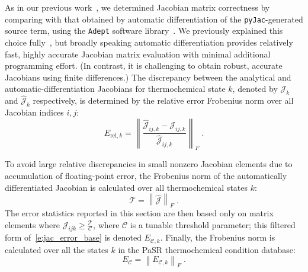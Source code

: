 \documentclass[12pt,number,sort&compress,preprint]{elsarticle}
\begin{document}
As in our previous work~\cite{Niemeyer:2016aa}, we determined Jacobian matrix correctness by comparing with that obtained by automatic differentiation of the \texttt{pyJac}-generated source term, using the \texttt{Adept} software library~\cite{adept-v11,hogan2014fast}.
We previously explained this choice fully~\cite{Niemeyer:2016aa}, but broadly speaking automatic differentiation provides relatively fast, highly accurate Jacobian matrix evaluation with minimal additional programming effort.
(In contrast, it is challenging to obtain robust, accurate Jacobians using finite differences.)
The discrepancy between the analytical and automatic-differentiation Jacobians for thermochemical state $k$, denoted by $\mathcal{J}_k$ and $\hat{\mathcal{J}}_k$ respectively, is determined by the relative error Frobenius norm over all Jacobian indices $i, j$:
\begin{equation}
 \label{e:jac_error_base}
 E_{\text{rel}, k} = \left\lVert \frac{\hat{\mathcal{J}}_{ij,k} - \mathcal{J}_{ij,k}}{\hat{\mathcal{J}}_{ij,k}} \right\rVert_{F} \;.
\end{equation}

To avoid large relative discrepancies in small nonzero Jacobian elements due to accumulation of floating-point error, the Frobenius norm of the automatically differentiated Jacobian is calculated over all thermochemical states $k$:
\begin{equation}
 \label{e:thresh}
 \mathcal{T} = \left\lVert \mathcal{\hat{J}} \right\rVert_{F} \;.
\end{equation}
The error statistics reported in this section are then based only on matrix elements where $\mathcal{J}_{ijk} \ge \frac{\mathcal{T}}{\mathcal{C}}$, where $\mathcal{C}$ is a tunable threshold parameter; this filtered form of~\cref{e:jac_error_base} is denoted $E_{\mathcal{C},k}$.
Finally, the Frobenius norm is calculated over all the states $k$ in the PaSR thermochemical condition database:
\begin{equation}
 \label{e:thresholded_error}
 E_{\mathcal{C}} = \left\lVert E_{\mathcal{C},k} \right\rVert_{F} \;.
\end{equation}
\end{document}
